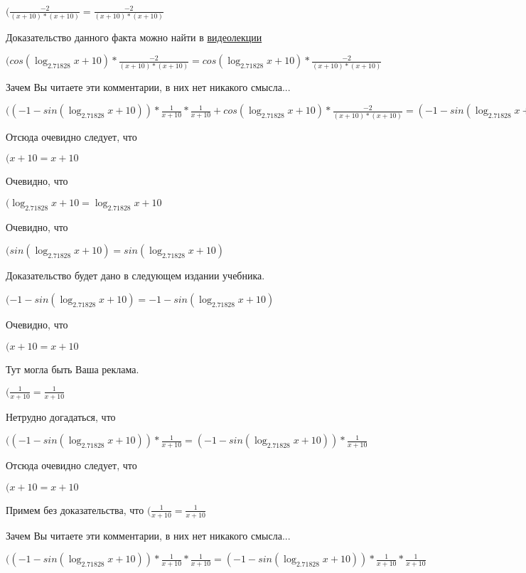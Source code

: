 \documentclass[12pt,a4paper,fleqn]{article}
\theoremstyle{definition}
\begin{document}
$(\frac{ -2 }{( x  +  10 ) * ( x  +  10 )}
 = \frac{ -2 }{( x  +  10 ) * ( x  +  10 )}
$

Доказательство данного факта можно найти в \href{https://www.youtube.com/watch?v=dQw4w9WgXcQ}{видеолекции}

$(cos(\log_{ 2.71828 }{ x  +  10 }) * \frac{ -2 }{( x  +  10 ) * ( x  +  10 )}
 = cos(\log_{ 2.71828 }{ x  +  10 }) * \frac{ -2 }{( x  +  10 ) * ( x  +  10 )}
$

Зачем Вы читаете эти комментарии, в них нет никакого смысла...

$(( -1  - sin(\log_{ 2.71828 }{ x  +  10 })) * \frac{ 1 }{ x  +  10 }
 * \frac{ 1 }{ x  +  10 }
 + cos(\log_{ 2.71828 }{ x  +  10 }) * \frac{ -2 }{( x  +  10 ) * ( x  +  10 )}
 = ( -1  - sin(\log_{ 2.71828 }{ x  +  10 })) * \frac{ 1 }{ x  +  10 }
 * \frac{ 1 }{ x  +  10 }
 + cos(\log_{ 2.71828 }{ x  +  10 }) * \frac{ -2 }{( x  +  10 ) * ( x  +  10 )}
$

Отсюда очевидно следует, что

$( x  +  10  =  x  +  10 $

Очевидно, что

$(\log_{ 2.71828 }{ x  +  10 } = \log_{ 2.71828 }{ x  +  10 }$

Очевидно, что

$(sin(\log_{ 2.71828 }{ x  +  10 }) = sin(\log_{ 2.71828 }{ x  +  10 })$

Доказательство будет дано в следующем издании учебника.

$( -1  - sin(\log_{ 2.71828 }{ x  +  10 }) =  -1  - sin(\log_{ 2.71828 }{ x  +  10 })$

Очевидно, что

$( x  +  10  =  x  +  10 $

Тут могла быть Ваша реклама.

$(\frac{ 1 }{ x  +  10 }
 = \frac{ 1 }{ x  +  10 }
$

Нетрудно догадаться, что

$(( -1  - sin(\log_{ 2.71828 }{ x  +  10 })) * \frac{ 1 }{ x  +  10 }
 = ( -1  - sin(\log_{ 2.71828 }{ x  +  10 })) * \frac{ 1 }{ x  +  10 }
$

Отсюда очевидно следует, что

$( x  +  10  =  x  +  10 $

Примем без доказательства, что
$(\frac{ 1 }{ x  +  10 }
 = \frac{ 1 }{ x  +  10 }
$

Зачем Вы читаете эти комментарии, в них нет никакого смысла...

$(( -1  - sin(\log_{ 2.71828 }{ x  +  10 })) * \frac{ 1 }{ x  +  10 }
 * \frac{ 1 }{ x  +  10 }
 = ( -1  - sin(\log_{ 2.71828 }{ x  +  10 })) * \frac{ 1 }{ x  +  10 }
 * \frac{ 1 }{ x  +  10 }
$
\end{document}
